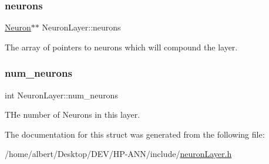 \subsubsection{\texorpdfstring{neurons}{neurons}}
{\footnotesize\ttfamily \hyperlink{structNeuron}{Neuron}$\ast$$\ast$ Neuron\+Layer\+::neurons}

The array of pointers to neurons which will compound the layer. \mbox{\label{structNeuronLayer_a5f293e290fbfdde756fe43af034ec421}} 
\subsubsection{\texorpdfstring{num\+\_\+neurons}{num\_neurons}}
{\footnotesize\ttfamily int Neuron\+Layer\+::num\+\_\+neurons}

T\+He number of Neurons in this layer. 

The documentation for this struct was generated from the following file\+:\begin{DoxyCompactItemize}
\item 
/home/albert/\+Desktop/\+D\+E\+V/\+H\+P-\/\+A\+N\+N/include/\hyperlink{neuronLayer_8h}{neuron\+Layer.\+h}\end{DoxyCompactItemize}
